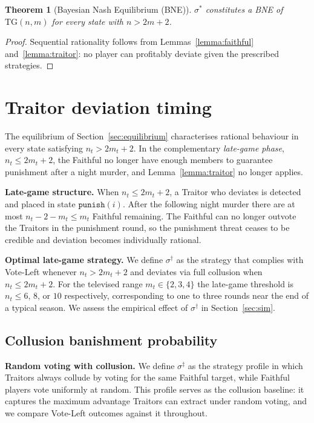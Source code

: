 \documentclass[11pt,a4paper]{article}
\newtheorem{theorem}{Theorem}
\begin{document}
\begin{theorem}[Bayesian Nash Equilibrium (BNE)]\label{thm:pbe}
\(\sigma^*\) constitutes a BNE of \(\mathrm{TG}(n, m)\) for every state with
\(n > 2m + 2\).
\end{theorem}

\begin{proof}
Sequential rationality follows from Lemmas~\ref{lemma:faithful}
and~\ref{lemma:traitor}: no player can profitably deviate given the prescribed
strategies.
\end{proof}

\section{Traitor deviation timing}\label{sec:timing}

The equilibrium of Section~\ref{sec:equilibrium} characterises rational
behaviour in every state satisfying \(n_t > 2m_t + 2\). In the
complementary \emph{late-game phase}, \(n_t \leq 2m_t + 2\), the Faithful
no longer have enough members to guarantee punishment after a night murder,
and Lemma~\ref{lemma:traitor} no longer applies.

\textbf{Late-game structure.} When \(n_t \leq 2m_t + 2\), a Traitor who
deviates is detected and placed in state \(\mathtt{punish}(i)\). After the
following night murder there are at most \(n_t - 2 - m_t \leq m_t\)
Faithful remaining. The Faithful can no longer outvote the Traitors in the
punishment round, so the punishment threat ceases to be credible and
deviation becomes individually rational.

\textbf{Optimal late-game strategy.} We define \(\sigma^\dagger\) as the
strategy that complies with Vote-Left whenever \(n_t > 2m_t + 2\) and
deviates via full collusion when \(n_t \leq 2m_t + 2\). For
the televised range \(m_t \in \{2, 3, 4\}\) the late-game threshold is
\(n_t \leq 6\), \(8\), or \(10\) respectively, corresponding to one to
three rounds near the end of a typical season. We assess the empirical
effect of \(\sigma^\dagger\) in Section~\ref{sec:sim}.

\subsection{Collusion banishment probability}
\label{sec:collusion-banishment}

\textbf{Random voting with collusion.} We define \(\sigma^\ddagger\) as the
strategy profile in which Traitors always collude by voting for the same
Faithful target, while Faithful players vote uniformly at random. This profile
serves as the collusion baseline: it captures the maximum advantage Traitors
can extract under random voting, and we compare Vote-Left outcomes against it
throughout.
\end{document}

